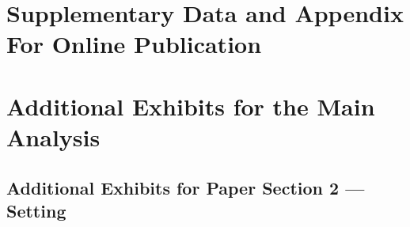 \documentclass[12pt,english]{article}
\begin{document}

\FloatBarrier
\singlespace


\clearpage


\appendix
\vspace{-1cm}
\section*{\centering \Huge{Supplementary Data and Appendix} \\ \LARGE{For Online Publication}}


\startcontents


\setcounter{table}{0}
\renewcommand{\thetable}{A\arabic{table}}
\setcounter{figure}{0}
\renewcommand{\thefigure}{A\arabic{figure}}
\setcounter{section}{0}
\renewcommand{\thesection}{A\arabic{section}}


\section{Additional Exhibits for the Main Analysis}


\FloatBarrier


\subsection{Additional Exhibits for Paper Section 2 --- Setting}

\end{document}
